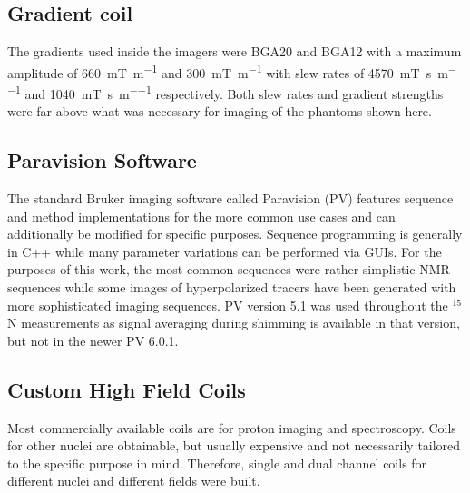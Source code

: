         \subsection{Gradient coil}
        The gradients used inside the imagers were BGA20 and BGA12 with a maximum amplitude of \SI{660}{\milli\tesla\per\meter} and \SI{300}{\milli\tesla\per\meter} with slew rates of \SI{4570}{\milli\tesla\per\second\per\meter}  and \SI{1040}{\milli\tesla\per\second\per\meter} respectively. Both slew rates and gradient strengths were far above what was necessary for imaging of the phantoms shown here.
        \subsection{Paravision Software}
        The standard Bruker imaging software called Paravision (PV) features sequence and method implementations for the more common use cases and can additionally be modified for specific purposes. Sequence programming is generally in C++ while many parameter variations can be performed via GUIs.  For the purposes of this work, the most common sequences were rather simplistic NMR sequences while some images of hyperpolarized tracers have been generated with more sophisticated imaging sequences. PV version 5.1 was used throughout the $^{15}$N measurements as signal averaging during shimming is available in that version, but not in the newer PV 6.0.1.
        \subsection{Custom High Field Coils}
            Most commercially available coils are for proton imaging and spectroscopy. Coils for other nuclei are obtainable, but usually expensive and not necessarily tailored to the specific purpose in mind. Therefore, single and dual channel coils for different nuclei and different fields were built.
